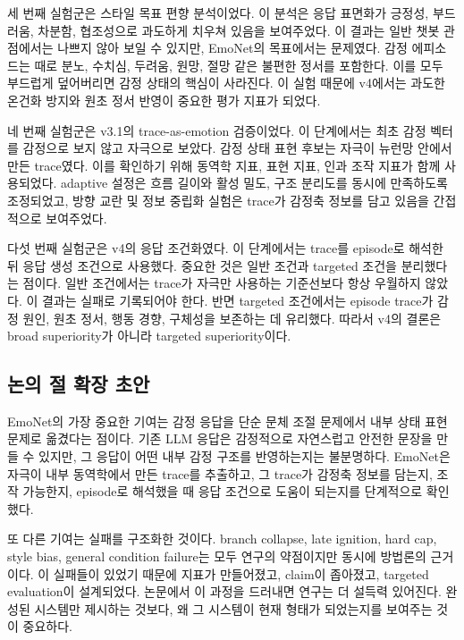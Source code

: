 \documentclass[11pt,a4paper]{article}
\begin{document}
세 번째 실험군은 스타일 목표 편향 분석이었다. 이 분석은 응답 표면화가 긍정성, 부드러움, 차분함, 협조성으로 과도하게 치우쳐 있음을 보여주었다. 이 결과는 일반 챗봇 관점에서는 나쁘지 않아 보일 수 있지만, EmoNet의 목표에서는 문제였다. 감정 에피소드는 때로 분노, 수치심, 두려움, 원망, 절망 같은 불편한 정서를 포함한다. 이를 모두 부드럽게 덮어버리면 감정 상태의 핵심이 사라진다. 이 실험 때문에 v4에서는 과도한 온건화 방지와 원초 정서 반영이 중요한 평가 지표가 되었다.

네 번째 실험군은 v3.1의 trace-as-emotion 검증이었다. 이 단계에서는 최초 감정 벡터를 감정으로 보지 않고 자극으로 보았다. 감정 상태 표현 후보는 자극이 뉴런망 안에서 만든 trace였다. 이를 확인하기 위해 동역학 지표, 표현 지표, 인과 조작 지표가 함께 사용되었다. adaptive 설정은 흐름 길이와 활성 밀도, 구조 분리도를 동시에 만족하도록 조정되었고, 방향 교란 및 정보 중립화 실험은 trace가 감정축 정보를 담고 있음을 간접적으로 보여주었다.

다섯 번째 실험군은 v4의 응답 조건화였다. 이 단계에서는 trace를 episode로 해석한 뒤 응답 생성 조건으로 사용했다. 중요한 것은 일반 조건과 targeted 조건을 분리했다는 점이다. 일반 조건에서는 trace가 자극만 사용하는 기준선보다 항상 우월하지 않았다. 이 결과는 실패로 기록되어야 한다. 반면 targeted 조건에서는 episode trace가 감정 원인, 원초 정서, 행동 경향, 구체성을 보존하는 데 유리했다. 따라서 v4의 결론은 broad superiority가 아니라 targeted superiority이다.

\subsection{논의 절 확장 초안}

EmoNet의 가장 중요한 기여는 감정 응답을 단순 문체 조절 문제에서 내부 상태 표현 문제로 옮겼다는 점이다. 기존 LLM 응답은 감정적으로 자연스럽고 안전한 문장을 만들 수 있지만, 그 응답이 어떤 내부 감정 구조를 반영하는지는 불분명하다. EmoNet은 자극이 내부 동역학에서 만든 trace를 추출하고, 그 trace가 감정축 정보를 담는지, 조작 가능한지, episode로 해석했을 때 응답 조건으로 도움이 되는지를 단계적으로 확인했다.

또 다른 기여는 실패를 구조화한 것이다. branch collapse, late ignition, hard cap, style bias, general condition failure는 모두 연구의 약점이지만 동시에 방법론의 근거이다. 이 실패들이 있었기 때문에 지표가 만들어졌고, claim이 좁아졌고, targeted evaluation이 설계되었다. 논문에서 이 과정을 드러내면 연구는 더 설득력 있어진다. 완성된 시스템만 제시하는 것보다, 왜 그 시스템이 현재 형태가 되었는지를 보여주는 것이 중요하다.
\end{document}
